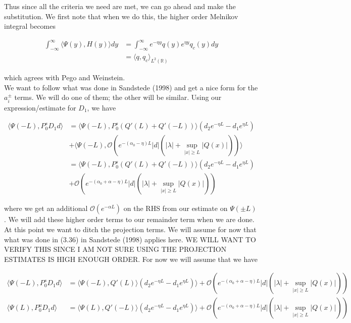 \documentclass[12pt]{article}
\def\R{{\mathbb R}}
\begin{document}
Thus since all the criteria we need are met, we can go ahead and make the substitution. We first note that when we do this, the higher order Melnikov integral becomes

\begin{align*}
\int_{-\infty}^{\infty} \langle \Psi(y), H(y) \rangle dy &= \int_{-\infty}^{\infty} e^{-\eta y} q(y) e^{\eta y} q_c(y) dy \\
&= \langle q, q_c \rangle_{L^2(\R)}
\end{align*}

which agrees with Pego and Weinstein. \\

We want to follow what was done in Sandstede (1998) and get a nice form for the $a_i^\pm$ terms. We will do one of them; the other will be similar. Using our expression/estimate for $D_1$, we have

\begin{align*}
\langle \Psi(-L), P_0^s D_1 d \rangle &= \langle \Psi(-L), P_0^s(Q'(L) + Q'(-L)) \rangle (d_2 e^{-\eta L} - d_1 e^{\eta L}) \\
&+\langle \Psi(-L), \mathcal{O} \left( e^{-(\alpha_0 - \eta) L}|d| \left( |\lambda| +  \sup_{|x| \geq L} |Q(x)| \right) \right) \rangle \\
&= \langle \Psi(-L), P_0^s(Q'(L) + Q'(-L)) \rangle (d_2 e^{-\eta L} - d_1 e^{\eta L}) \\
&+ \mathcal{O} \left( e^{-(\alpha_0 + \alpha - \eta ) L}|d| \left( |\lambda| +  \sup_{|x| \geq L} |Q(x)| \right) \right) 
\end{align*}

where we get an additional $\mathcal{O}(e^{-\alpha L})$ on the RHS from our estimate on $\Psi(\pm L)$. We will add these higher order terms to our remainder term when we are done. \\

At this point we want to ditch the projection terms. We will assume for now that what was done in (3.36) in Sandstede (1998) applies here. WE WILL WANT TO VERIFY THIS SINCE I AM NOT SURE USING THE PROJECTION ESTIMATES IS HIGH ENOUGH ORDER. For now we will assume that we have

\begin{align*}
\langle \Psi(-L), P_0^s D_1 d \rangle &= \langle \Psi(-L), Q'(L) \rangle (d_2 e^{-\eta L} - d_1 e^{\eta L}) \rangle + \mathcal{O} \left( e^{-(\alpha_0 + \alpha - \eta ) L}|d| \left( |\lambda| +  \sup_{|x| \geq L} |Q(x)| \right) \right) \\
\langle \Psi(L), P_0^u D_1 d \rangle &= \langle \Psi(L), Q'(-L) \rangle (d_2 e^{-\eta L} - d_1 e^{\eta L}) \rangle + \mathcal{O} \left( e^{-(\alpha_0 + \alpha - \eta ) L}|d| \left( |\lambda| +  \sup_{|x| \geq L} |Q(x)| \right) \right)
\end{align*}
\end{document}
